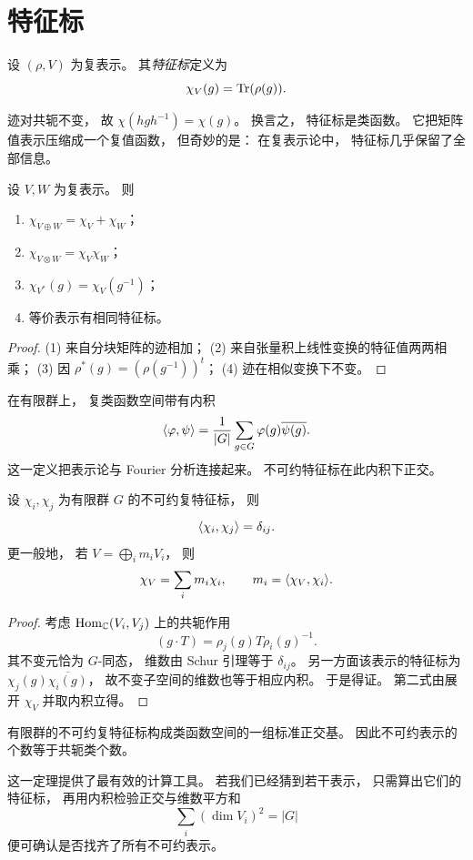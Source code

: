 \section{特征标}
\begin{definition}
设 $(\rho,V)$ 为复表示。 其\emph{特征标}定义为
\[
\chi_V(g)=\mathrm{Tr}(\rho(g)).
\]
\end{definition}
迹对共轭不变， 故 $\chi(hgh^{-1})=\chi(g)$。 换言之， 特征标是类函数。 它把矩阵值表示压缩成一个复值函数， 但奇妙的是： 在复表示论中， 特征标几乎保留了全部信息。
\begin{proposition}
设 $V,W$ 为复表示。 则
\begin{enumerate}[label=(\arabic*)]
\item $\chi_{V\oplus W}=\chi_V+\chi_W$；
\item $\chi_{V\otimes W}=\chi_V\chi_W$；
\item $\chi_{V^*}(g)=\chi_V(g^{-1})$；
\item 等价表示有相同特征标。
\end{enumerate}
\end{proposition}
\begin{proof}
(1) 来自分块矩阵的迹相加； (2) 来自张量积上线性变换的特征值两两相乘； (3) 因 $\rho^*(g)=(\rho(g^{-1}))^t$； (4) 迹在相似变换下不变。
\end{proof}
在有限群上， 复类函数空间带有内积
\[
\langle \varphi, \psi \rangle=\frac1{|G|}\sum_{g\in G}\varphi(g)\overline{\psi(g)}.
\]
这一定义把表示论与 Fourier 分析连接起来。 不可约特征标在此内积下正交。
\begin{theorem}[特征标正交关系]
设 $\chi_i,\chi_j$ 为有限群 $G$ 的不可约复特征标， 则
\[
\langle \chi_i, \chi_j \rangle=\delta_{ij}.
\]
更一般地， 若 $V=\bigoplus_i m_i V_i$， 则
\[
\chi_V=\sum_i m_i\chi_i,
\qquad
m_i=\langle \chi_V, \chi_i \rangle.
\]
\end{theorem}
\begin{proof}
考虑 $\mathrm{Hom}_{\mathbb{C}}(V_i,V_j)$ 上的共轭作用
\[
(g\cdot T)=\rho_j(g)T\rho_i(g)^{-1}.
\]
其不变元恰为 $G$-同态， 维数由 Schur 引理等于 $\delta_{ij}$。 另一方面该表示的特征标为 $\chi_j(g)\overline{\chi_i(g)}$， 故不变子空间的维数也等于相应内积。 于是得证。 第二式由展开 $\chi_V$ 并取内积立得。
\end{proof}
\begin{corollary}
有限群的不可约复特征标构成类函数空间的一组标准正交基。 因此不可约表示的个数等于共轭类个数。
\end{corollary}
\begin{remark}
这一定理提供了最有效的计算工具。 若我们已经猜到若干表示， 只需算出它们的特征标， 再用内积检验正交与维数平方和
\[
\sum_i (\dim V_i)^2=|G|
\]
便可确认是否找齐了所有不可约表示。
\end{remark}
